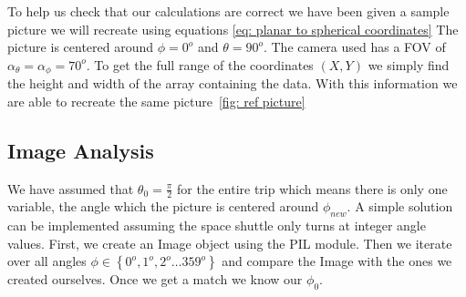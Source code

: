 \documentclass[reprint,english,notitlepage]{revtex4-2}
\begin{document}
To help us check that our calculations are correct we have been given a sample picture we will recreate using equations \ref{eq: planar to spherical coordinates}
The picture is centered around $ \phi = 0^{o} $ and $ \theta = 90^{o} $. The camera used has a FOV of $ \alpha_{\theta} = \alpha_{\phi} = 70^{o} $. To get the full range of the coordinates $ (X,Y) $ we simply find the height and width of the array containing the data. With this information we are able to recreate the same picture~\ref{fig: ref picture}


\subsection{Image Analysis} \label{ssec: image analysis}
We have assumed that $ \theta_{0} = \frac{\pi}{2} $ for the entire trip which means there is only one variable, the angle which the picture is centered around $ \phi_{new} $. A simple solution can be implemented assuming the space shuttle only turns at integer angle values. First, we create an Image object using the PIL module. Then we iterate over all angles $ \phi \in  \left\{ 0^{o}, 1^{o}, 2^{o} \dots 359 ^{o} \right\}  $ and compare the Image with the ones we created ourselves. Once we get a match we know our $ \phi _{0} $.
\end{document}
